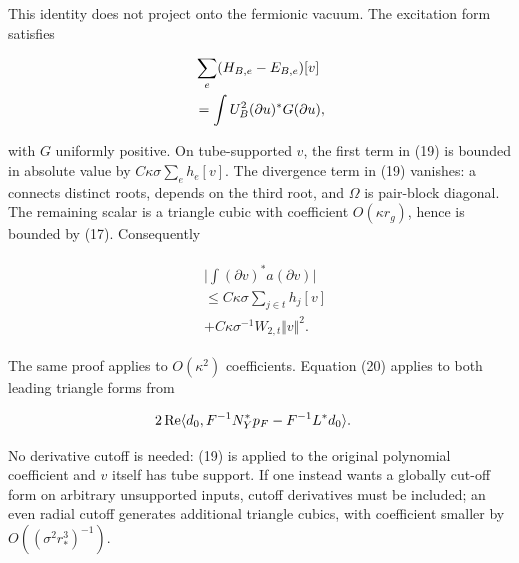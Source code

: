 This identity does not project onto the fermionic vacuum. The excitation
form satisfies

\begin{gather*}
\begin{aligned}
& \sum _{e} (H_{B,e}-E_{B,e})[v] \\
& =\int  U_{B}^{2} (\partial  u)^{*}G(\partial  u),
\end{aligned}\notag
\end{gather*}

with \(G\) uniformly positive. On tube-supported \(v\), the first term
in (19) is bounded in absolute value by
\(C \kappa  \sigma  \sum _{e} h_{e}[v]\). The divergence term in (19)
vanishes: a connects distinct roots, depends on the third root, and
\(\Omega\) is pair-block diagonal. The remaining scalar is a triangle
cubic with coefficient \(O(\kappa  r_{g})\), hence is bounded by (17).
Consequently

\begin{gather*}
\begin{aligned}
& \vert \int  (\partial  v)^{*} a (\partial  v)\vert \\
& \le  C \kappa  \sigma  \sum _{j \in  t} h_{j}[v] \\
& + C \kappa  \sigma ^{-1} W_{2,t} \Vert v\Vert ^{2}.
\end{aligned}\tag{20}
\end{gather*}

The same proof applies to \(O(\kappa ^{2})\) coefficients. Equation (20)
applies to both leading triangle forms from

\begin{gather*}
\begin{aligned}
& 2 \operatorname{Re} \langle d_{0},F^{-1} N_{Y}^{*} p_{F}-F^{-1} L^{*} d_{0}\rangle .
\end{aligned}\notag
\end{gather*}

No derivative cutoff is needed: (19) is applied to the original
polynomial coefficient and \(v\) itself has tube support. If one instead
wants a globally cut-off form on arbitrary unsupported inputs, cutoff
derivatives must be included; an even radial cutoff generates additional
triangle cubics, with coefficient smaller by
\(O((\sigma ^{2} r_{*}^{3})^{-1})\).

